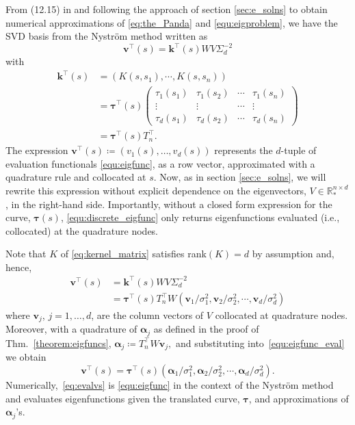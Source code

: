 \documentclass[pdflatex,iicol]{sn-jnl}%
\theoremstyle{thmstyleone}%
\theoremstyle{thmstyletwo}%
\theoremstyle{thmstylethree}%
\begin{document}
From (12.15) in \cite{fasshauer2015kernel} and following the approach of section \ref{sec:e_solns} to obtain numerical approximations of \eqref{eq:the_Panda} and \eqref{equ:eigproblem}, we have the SVD basis from the Nystr\"om method written as
\begin{equation}\label{equ:discrete_eigfunc}
\boldsymbol{v}^{\top}(s) = \mathbf{k}^{\top}(s) W V\Sigma^{-2}_d
\end{equation}
with 
\begin{align*}
    \mathbf{k}^{\top}(s) & = (K( s,  s_1), \cdots, K( s, s_n)) \\
                      & =  \boldsymbol{\tau}^{\top}(s) \left(\begin{matrix} \tau_1(s_1) & \tau_1(s_2) & \cdots&  \tau_1(s_n) \\ 
                     \vdots & \vdots & \cdots & \vdots\\
                     \tau_d(s_1) & \tau_d(s_2) & \cdots &  \tau_d(s_n) \end{matrix}\right)\\
                     & = \boldsymbol{\tau}^{\top}(s)T_n^{\top}.
\end{align*}
The expression $\boldsymbol{v}^{\top}(s) \coloneqq (v_1(s),\dots,v_d(s))$ represents the $d$-tuple of evaluation functionals \eqref{equ:eigfunc}, as a row vector, approximated with a quadrature rule and collocated at $s$. Now, as in section \ref{sec:e_solns}, we will rewrite this expression without explicit dependence on the eigenvectors, $V \in \mathbb{R}_*^{n\times d}$, in the right-hand side. Importantly, without a closed form expression for the curve, $\boldsymbol{\tau}(s)$, \eqref{equ:discrete_eigfunc} only returns eigenfunctions evaluated (i.e., collocated) at the quadrature nodes.

Note that $K$ of \eqref{eq:kernel_matrix} satisfies rank$(K) =d$ by assumption and, hence, 
\begin{align} \label{equ:eigfunc_eval}
    \boldsymbol{v}^{\top}( s) &=\mathbf{k}^{\top}(s) W V\Sigma^{-2}_d\\ \nonumber
        &=\boldsymbol{\tau}^{\top}(s)T_n^{\top}W(\mathbf{v}_1/\sigma_1^2, \mathbf{v}_2/\sigma_2^2, \cdots , \mathbf{v}_d /\sigma_d^2) \nonumber
\end{align}
where $\mathbf{v}_j$, $j=1,\dots,d$, are the column vectors of $V$ collocated at quadrature nodes. Moreover, with a quadrature of $\boldsymbol \alpha_j$ as defined in the proof of Thm.~\ref{theorem:eigfuncs},
$
\boldsymbol{\alpha}_j \coloneqq T_n^{\top}W \mathbf{v}_j,
$
and substituting into~\eqref{equ:eigfunc_eval} we obtain 
\begin{equation}\label{eq:evalvs}
\boldsymbol{v}^{\top}( s) = \boldsymbol{\tau}^{\top}(s) (\boldsymbol \alpha_1/\sigma_1^2,  \boldsymbol \alpha_2/\sigma_2^2, \cdots , \boldsymbol \alpha_d /\sigma_d^2).
\end{equation}
Numerically,~\eqref{eq:evalvs} is \eqref{equ:eigfunc} in the context of the Nystr\"om method and evaluates eigenfunctions given the translated curve, $\boldsymbol{\tau}$, and approximations of $\boldsymbol{\alpha}_j$'s. 
\end{document}

